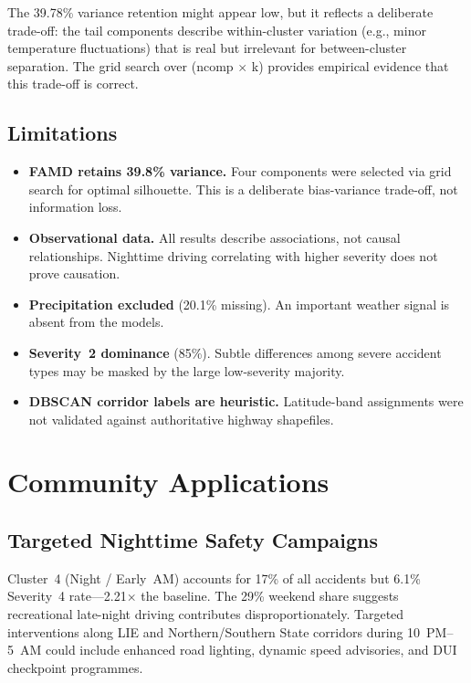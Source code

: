 \documentclass[11pt,letterpaper]{article}
\begin{document}
The 39.78\% variance retention might appear low, but it reflects a deliberate trade-off: the tail components describe within-cluster variation (e.g., minor temperature fluctuations) that is real but irrelevant for between-cluster separation. The grid search over (ncomp $\times$ k) provides empirical evidence that this trade-off is correct.

\subsection{Limitations}

\begin{itemize}[nosep]
\item \textbf{FAMD retains 39.8\% variance.} Four components were selected via grid search for optimal silhouette. This is a deliberate bias-variance trade-off, not information loss.
\item \textbf{Observational data.} All results describe associations, not causal relationships. Nighttime driving correlating with higher severity does not prove causation.
\item \textbf{Precipitation excluded} (20.1\% missing). An important weather signal is absent from the models.
\item \textbf{Severity~2 dominance} (85\%). Subtle differences among severe accident types may be masked by the large low-severity majority.
\item \textbf{DBSCAN corridor labels are heuristic.} Latitude-band assignments were not validated against authoritative highway shapefiles.
\end{itemize}

\section{Community Applications}

\subsection{Targeted Nighttime Safety Campaigns}

Cluster~4 (Night / Early~AM) accounts for 17\% of all accidents but 6.1\% Severity~4 rate---2.21$\times$ the baseline. The 29\% weekend share suggests recreational late-night driving contributes disproportionately. Targeted interventions along LIE and Northern/Southern State corridors during 10~PM--5~AM could include enhanced road lighting, dynamic speed advisories, and DUI checkpoint programmes.
\end{document}
